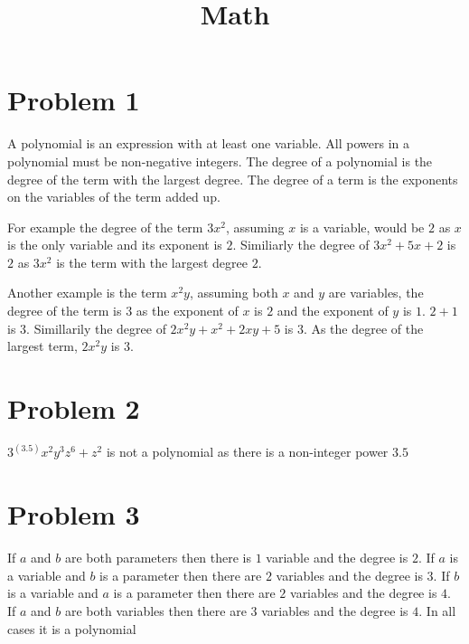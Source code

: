 \documentclass[12pt, letterpaper, twoside]{article}
\title{Math}
\begin{document}
	
	\maketitle
\section{Problem 1}
A polynomial is an expression with at least one variable. All powers in a polynomial must be non-negative integers. The degree of a polynomial is the degree of the term with the largest degree. The degree of a term is the exponents on the variables of the term added up.\par
For example the degree of the term $3x^2$, assuming $x$ is a variable, would be $2$ as $x$ is the only variable and its exponent is $2$. Similiarly the degree of $3x^2 + 5x +2$ is $2$ as $3x^2$ is the term with the largest degree $2$. \par
Another example is the term $x^2y$, assuming both $x$ and $y$ are variables, the degree of the term is $3$ as the exponent of $x$ is $2$ and the exponent of $y$ is $1$. $2 + 1$ is $3$. Simillarily the degree of $2x^2y + x^2 + 2xy + 5$ is $3$. As the degree of the largest term, $2x^2y$ is $3$. 
\section{Problem 2}
$3^(3.5)x^2y^3z^6 + z^2$ is not a polynomial as there is a non-integer power $3.5$
\section{Problem 3}
If $a$ and $b$ are both parameters then there is $1$ variable and the degree is $2$. If $a$ is a variable and $b$ is a parameter then there are $2$ variables and the degree is $3$. If $b$ is a variable and $a$ is a parameter then there are $2$ variables and the degree is $4$. If $a$ and $b$ are both variables then there are $3$ variables and the degree is $4$. In all cases it is a polynomial

	
\end{document}
